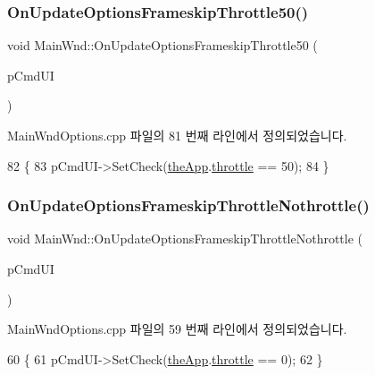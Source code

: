 \subsubsection{\texorpdfstring{On\+Update\+Options\+Frameskip\+Throttle50()}{OnUpdateOptionsFrameskipThrottle50()}}
{\footnotesize\ttfamily void Main\+Wnd\+::\+On\+Update\+Options\+Frameskip\+Throttle50 (\begin{DoxyParamCaption}\item[{C\+Cmd\+UI $\ast$}]{p\+Cmd\+UI }\end{DoxyParamCaption})\hspace{0.3cm}{\ttfamily [protected]}}



Main\+Wnd\+Options.\+cpp 파일의 81 번째 라인에서 정의되었습니다.


\begin{DoxyCode}
82 \{
83   pCmdUI->SetCheck(\mbox{\hyperlink{_v_b_a_8cpp_a8095a9d06b37a7efe3723f3218ad8fb3}{theApp}}.\mbox{\hyperlink{class_v_b_a_af21b98509a2589b38e4787f065b40a2b}{throttle}} == 50);
84 \}
\end{DoxyCode}
\mbox{\label{class_main_wnd_a257268a463135c72751be8111df48fae}} 
\subsubsection{\texorpdfstring{On\+Update\+Options\+Frameskip\+Throttle\+Nothrottle()}{OnUpdateOptionsFrameskipThrottleNothrottle()}}
{\footnotesize\ttfamily void Main\+Wnd\+::\+On\+Update\+Options\+Frameskip\+Throttle\+Nothrottle (\begin{DoxyParamCaption}\item[{C\+Cmd\+UI $\ast$}]{p\+Cmd\+UI }\end{DoxyParamCaption})\hspace{0.3cm}{\ttfamily [protected]}}



Main\+Wnd\+Options.\+cpp 파일의 59 번째 라인에서 정의되었습니다.


\begin{DoxyCode}
60 \{
61   pCmdUI->SetCheck(\mbox{\hyperlink{_v_b_a_8cpp_a8095a9d06b37a7efe3723f3218ad8fb3}{theApp}}.\mbox{\hyperlink{class_v_b_a_af21b98509a2589b38e4787f065b40a2b}{throttle}} == 0);  
62 \}
\end{DoxyCode}
\mbox{\label{class_main_wnd_a3d0b3623cc17e6a1f6855dff9106e737}} 
